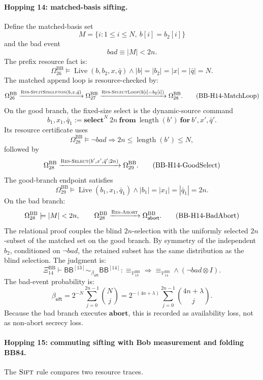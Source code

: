 \documentclass{report}
\theoremstyle{defn_style}
\providecommand{\Live}{\operatorname{Live}}
\providecommand{\HopBB}[1]{\mathsf{BB}^{[#1]}}
\begin{document}
\paragraph{Hopping 14: matched-basis sifting.}
Define the matched-basis set
\[
M=\{i:1\le i\le N,\ b[i]=b_2[i]\}
\]
and the bad event
\[
bad\equiv |M|<2n.
\]
The prefix resource fact is:
\[
\Omega^{\mathrm{BB}}_{26}
\models
\Live(b,b_2,x,\bar q)
\land
|b|=|b_2|=|x|=|\bar q|=N.
\tag{BB-H14-PrefixFact}
\]
The matched append loop is resource-checked by:
\[
\Omega^{\mathrm{BB}}_{26}
\xrightarrow{\textsc{Res-SplitSingleton}(b,x,\bar q)}
\Omega^{\mathrm{BB}}_{27}
\xrightarrow{\textsc{Res-SelectLoop}(b[i]=b_2[i])}
\Omega^{\mathrm{BB}}_{28}.
\tag{BB-H14-MatchLoop}\label{BB-H14-MatchLoop}
\]
On the good branch, the fixed-size select is the dynamic-source command
\[
  b_1,x_1,\bar q_1
  :=
  \mathbf{select}^{N}\ 2n\
  \mathbf{from}\ \operatorname{length}(b')\
  \mathbf{for}\ b',x',\bar q'.
\tag{BB-H14-DynamicSelectCmd}
\]
Its resource certificate uses
\[
  \Omega^{\mathrm{BB}}_{28}
  \models
  \neg bad\Longrightarrow
  2n\le \operatorname{length}(b')\le N,
\tag{BB-H14-GoodShape}
\]
followed by
\[
  \Omega^{\mathrm{BB}}_{28}
  \xrightarrow{\textsc{Res-Select}(b',x',\bar q';2n)}
  \Omega^{\mathrm{BB}}_{29}.
\tag{BB-H14-GoodSelect}\label{BB-H14-GoodSelect}
\]
The good-branch endpoint satisfies
\[
  \Omega^{\mathrm{BB}}_{29}\models
  \Live(b_1,x_1,\bar q_1)
  \land
  |b_1|=|x_1|=|\bar q_1|=2n.
\tag{BB-H14-GoodSelectPost}
\]
On the bad branch:
\[
\Omega^{\mathrm{BB}}_{28}
\models
|M|<2n,
\qquad
\Omega^{\mathrm{BB}}_{28}
\xrightarrow{\textsc{Res-Abort}}
\Omega^{\mathrm{BB}}_{\mathsf{abort}}.
\tag{BB-H14-BadAbort}\label{BB-H14-BadAbort}
\]
The relational proof couples the blind \(2n\)-selection with the uniformly
selected \(2n\)-subset of the matched set on the good branch.  By symmetry of
the independent \(b_2\), conditioned on \(\neg bad\), the retained subset has
the same distribution as the blind selection.  The judgment is:
\[
\Xi^{\mathrm{BB}}_{14}
\vdash
\HopBB{13}
\sim_{\beta_{\mathsf{sift}}}
\HopBB{14}
:
\equiv_{\mathcal V^{\mathrm{BB}}_{13}}
\Longrightarrow
\equiv_{\mathcal V^{\mathrm{BB}}_{14}}
\land(\neg bad\otimes I).
\tag{BB-H14-Rel}\label{BB-H14-Rel}
\]
The bad-event probability is:
\[
\beta_{\mathsf{sift}}
=
2^{-N}
\sum_{j=0}^{2n-1}\binom{N}{j}
=
2^{-(4n+\lambda)}
\sum_{j=0}^{2n-1}\binom{4n+\lambda}{j}.
\tag{BB-H14-Beta}
\]
Because the bad branch executes \(\mathbf{abort}\), this is recorded as
availability loss, not as non-abort secrecy loss.

\paragraph{Hopping 15: commuting sifting with Bob measurement and folding BB84.}
The \(\textsc{Sift}\) rule compares two resource traces.
\end{document}

